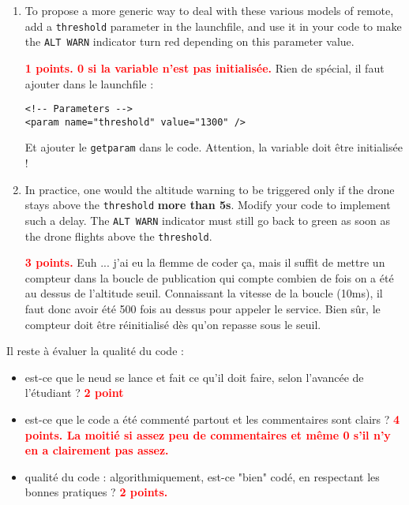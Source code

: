 \documentclass[10pt,a4paper,english]{exam}
\begin{document}
\begin{enumerate}
	      \begin{enumerate}
		      \item To propose a more generic way to deal with these various models of remote, add a
		            \texttt{threshold} parameter in the launchfile, and use it in your code to make the
		            \texttt{ALT WARN} indicator turn red depending on this parameter value.
		            \begin{solution}\textbf{\textcolor{red}{1 points. 0 si la variable n'est pas initialisée.}}
			            Rien de spécial, il faut ajouter dans le launchfile :
			            \begin{verbatim}
<!-- Parameters -->
<param name="threshold" value="1300" />								  
						\end{verbatim}
			            Et ajouter le \texttt{getparam} dans le code. Attention, la variable doit
			            être initialisée !
		            \end{solution}
		      \item In practice, one would the altitude warning to be triggered only if the drone stays above
		            the \texttt{threshold} \textbf{more than 5s}. Modify your code to implement such a delay. The
		            \texttt{ALT WARN} indicator must still go back to green as soon as the drone flights above the
		            \texttt{threshold}.
		            \begin{solution}\textbf{\textcolor{red}{3 points.}}
			            Euh ... j'ai eu la flemme de coder ça, mais il suffit de mettre un compteur
			            dans la boucle de publication qui compte combien de fois on a été au dessus
			            de l'altitude seuil. Connaissant la vitesse de la boucle (10ms), il faut
			            donc avoir été 500 fois au dessus pour appeler le service. Bien sûr, le
			            compteur doit être réinitialisé dès qu'on repasse sous le seuil.
		            \end{solution}
	      \end{enumerate}


\end{enumerate}

\begin{solution}
	Il reste à évaluer la qualité du code :
	\begin{itemize}
		\item est-ce que le neud se lance et fait ce qu'il doit faire, selon l'avancée de l'étudiant ? \textbf{\textcolor{red}{2 point}}
		\item est-ce que le code a été commenté partout et les commentaires sont clairs ?
		      \textbf{\textcolor{red}{4 points. La moitié si assez peu de commentaires et même 0 s'il n'y
				      en a clairement pas assez.}}
		\item qualité du code : algorithmiquement, est-ce "bien" codé, en respectant les bonnes pratiques ? \textbf{\textcolor{red}{2 points.}}
	\end{itemize}

\end{solution}
\end{document}
